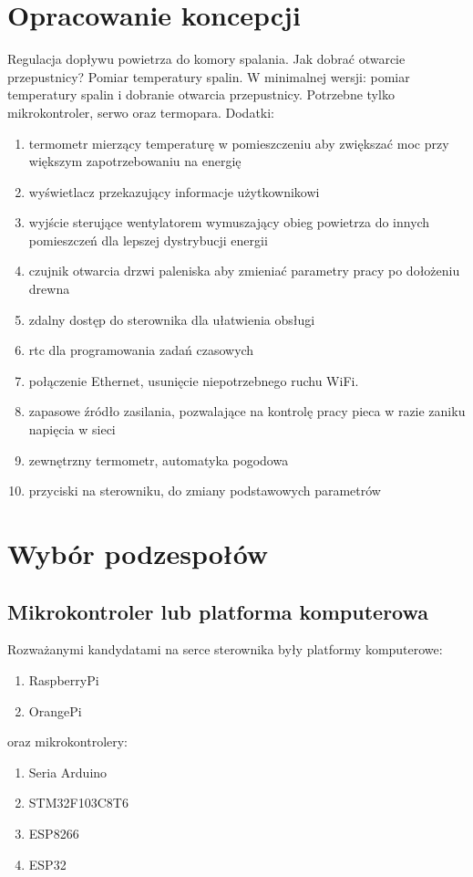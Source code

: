 \documentclass[11pt]{report}
\begin{document}
  
 \chapter{Opracowanie koncepcji}
 Regulacja dopływu powietrza do komory spalania. Jak dobrać otwarcie przepustnicy? Pomiar temperatury spalin.
 W minimalnej wersji: pomiar temperatury spalin i dobranie otwarcia przepustnicy. Potrzebne tylko mikrokontroler, serwo oraz termopara.
 Dodatki:
 \begin{enumerate}
 \item termometr mierzący temperaturę w pomieszczeniu aby zwiększać moc przy większym zapotrzebowaniu na energię
 \item wyświetlacz przekazujący informacje użytkownikowi
 \item wyjście sterujące wentylatorem wymuszający obieg powietrza do innych pomieszczeń dla lepszej dystrybucji energii
 \item czujnik otwarcia drzwi paleniska aby zmieniać parametry pracy po dołożeniu drewna
 \item zdalny dostęp do sterownika dla ułatwienia obsługi
 \item rtc dla programowania zadań czasowych
 \item połączenie Ethernet, usunięcie niepotrzebnego ruchu WiFi.
 \item zapasowe źródło zasilania, pozwalające na kontrolę pracy pieca w razie zaniku napięcia w sieci
 \item zewnętrzny termometr, automatyka pogodowa
 \item przyciski na sterowniku, do zmiany podstawowych parametrów
 \end{enumerate}  
 
  
 \chapter{Wybór podzespołów}
 \section{Mikrokontroler lub platforma komputerowa}
 Rozważanymi kandydatami na serce sterownika były platformy komputerowe:
 \begin{enumerate}
 \item RaspberryPi
 \item OrangePi
 \end{enumerate}
 oraz mikrokontrolery:
 \begin{enumerate}
 \item Seria Arduino
 \item STM32F103C8T6
 \item ESP8266
 \item ESP32
 \end{enumerate}
 
\end{document}
